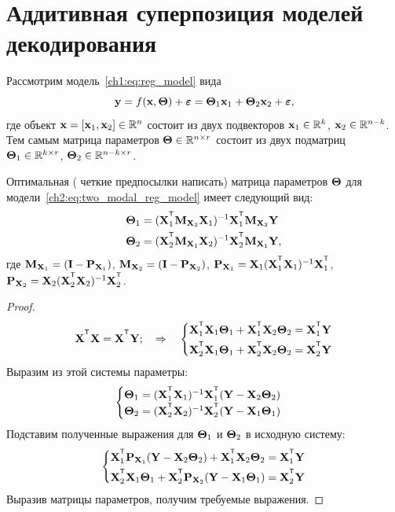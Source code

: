 \section{Аддитивная суперпозиция моделей декодирования}

Рассмотрим модель~\eqref{ch1:eq:reg_model} вида
\begin{equation}
	\mathbf{y} = f(\mathbf{x}, \boldsymbol{\Theta}) + \boldsymbol{\varepsilon} = \boldsymbol{\Theta}_1 \mathbf{x}_1 + \boldsymbol{\Theta}_2 \mathbf{x}_2 + \boldsymbol{\varepsilon},
	\label{ch2:eq:two_modal_reg_model}
\end{equation}
где объект $\mathbf{x} = [\mathbf{x}_1, \mathbf{x}_2] \in \mathbb{R}^n$ состоит из двух подвекторов $\mathbf{x}_1 \in \mathbb{R}^k$, $\mathbf{x}_2 \in \mathbb{R}^{n - k}$. Тем самым матрица параметров $\boldsymbol{\Theta} \in \mathbb{R}^{n \times r}$ состоит из двух подматриц $\boldsymbol{\Theta}_1 \in \mathbb{R}^{k \times r}$, $\boldsymbol{\Theta}_2 \in \mathbb{R}^{n - k \times r}$. 

\begin{statement}
	\label{stat:two_modal_params}
	Оптимальная ({\color{red} четкие предпосылки написать}) матрица параметров $\boldsymbol{\Theta}$ для модели~\eqref{ch2:eq:two_modal_reg_model} имеет следующий вид:
	\begin{align*}
		\bTheta_1 &= (\bX_1^{\T} \bM_{\bX_2} \bX_1)^{-1} \bX_1^{\T} \bM_{\bX_2} \bY \\
		\bTheta_2 &= (\bX_2^{\T} \bM_{\bX_1} \bX_2)^{-1} \bX_2^{\T} \bM_{\bX_1} \bY,
	\end{align*}
	где $\mathbf{M}_{\mathbf{X}_1} = (\mathbf{I} - \mathbf{P}_{\mathbf{X}_1})$, $\mathbf{M}_{\mathbf{X}_2} = (\mathbf{I} - \mathbf{P}_{\mathbf{X}_2})$, $\bP_{\bX_1} = \bX_1 (\bX_1^{\T} \bX_1)^{-1} \bX_1^{\T}$, $\bP_{\bX_2} = \bX_2 (\bX_2^{\T} \bX_2)^{-1} \bX_2^{\T}$.
\end{statement}

\begin{proof}
	\[
		\bX^{\T} \bX = \bX^{\T} \bY; \quad \Rightarrow \quad
		\begin{cases*}
			\bX_1^{\T} \bX_1 \bTheta_1 + \bX_1^{\T} \bX_2 \bTheta_2 = \bX_1^{\T} \bY \\
			\bX_2^{\T} \bX_1 \bTheta_1 + \bX_2^{\T} \bX_2 \bTheta_2 = \bX_2^{\T} \bY 
		\end{cases*}
	\]
	Выразим из этой системы параметры:
	\[
		\begin{cases}
			\bTheta_1 = (\bX_1^{\T} \bX_1)^{-1} \bX_1^{\T} (\bY - \bX_2 \bTheta_2) \\
			\bTheta_2 = (\bX_2^{\T} \bX_2 )^{-1}  \bX_2^{\T} (\bY - \bX_1 \bTheta_1)
		\end{cases}
	\]
	Подставим полученные выражения для $\boldsymbol{\Theta}_1$ и $\boldsymbol{\Theta}_2$ в исходную систему:
	\[
				\begin{cases*}
					\bX_1^{\T} \bP_{\bX_1} (\bY - \bX_2 \bTheta_2) + \bX_1^{\T} \bX_2 \bTheta_2 = \bX_1^{\T} \bY \\
					\bX_2^{\T} \bX_1 \bTheta_1 + \bX_2^{\T}\bP_{\bX_2} (\bY - \bX_1 \bTheta_1) = \bX_2^{\T} \bY 
				\end{cases*}
	\]
	Выразив матрицы параметров, получим требуемые выражения.
\end{proof}

